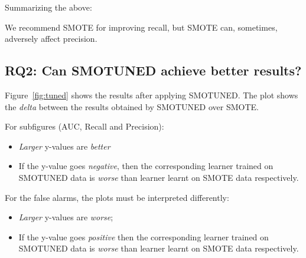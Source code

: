 \documentclass[10pt,conference]{IEEEtran}
\newcommand{\bi}{\begin{itemize}[leftmargin=0.4cm]}
\newcommand{\ei}{\end{itemize}}
\theoremstyle{break}
\theoremstyle{break}
\begin{document}



\noindent
Summarizing the above:
\begin{lesson1}
We recommend SMOTE for improving recall, but SMOTE can,
sometimes, adversely affect
precision.
\end{lesson1}


\subsection{\textbf{RQ2: Can SMOTUNED achieve better results?}}

Figure~\ref{fig:tuned} shows the results
after applying SMOTUNED. The
plot shows the {\em delta} between
the results obtained by SMOTUNED over SMOTE.

For subfigures (AUC, Recall and Precision):
\bi
\item 
{\em Larger} y-values
are {\em better} 
\item
If the y-value goes {\em negative}, then the corresponding learner trained on SMOTUNED data is {\em worse} than learner learnt on SMOTE data respectively. 
\ei
For the false alarms, the
plots must be interpreted differently:
\bi
\item
{\em Larger} y-values are {\em worse};
\item
If the y-value goes {\em positive} then the corresponding learner trained on SMOTUNED data is {\em worse} than learner learnt on SMOTE data respectively.
\ei
\end{document}
